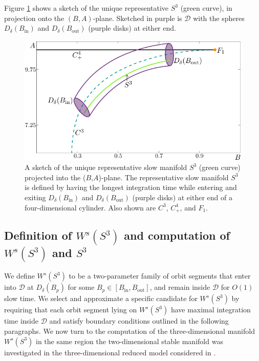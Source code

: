 \documentclass{ws-ijbc}
\begin{document}
Figure \ref{figure_2} shows a sketch of the unique representative $S^3$ (green curve), in projection onto the $(B,A)$-plane.  Sketched in purple is $\mathscr{D}$ with the spheres $D_\delta(B_{\mathrm{in}})$ and $D_\delta(B_{\mathrm{out}})$ (purple disks) at either end.

\begin{figure}[!t]
\begin{center}
\includegraphics{./figures/MKMO_2.pdf}
\end{center}
\caption{A sketch of the unique representative slow manifold $S^3$ (green curve) projected into the ($B$,$A$)-plane.  The representative slow manifold $S^3$ is defined by having the longest integration time while entering and exiting  $D_\delta(B_{\mathrm{in}})$ and $D_\delta(B_{\mathrm{out}})$ (purple disks) at either end of a four-dimensional cylinder.  Also shown are $C^3$, $C^4_+$, and $F_1$.}
\label{figure_2}
\end{figure}

\subsection{Definition of $W^{s}(S^3)$ and computation of $W^{s}(S^3)$ and  $S^3$}

We define $W^{s}(S^3)$ to be a two-parameter family of orbit segments that enter into $\mathscr{D}$ at $D_{\delta}(B_p)$ for some $B_p \in [B_{\text{in}}, B_{\text{out}}]$, and remain inside $\mathscr{D}$ for $O(1)$ slow time.  We select and approximate a specific candidate for $W^{s}(S^3)$ by requiring that each orbit segment lying on $W^{s}(S^3)$ have maximal integration time inside $\mathscr{D}$ and satisfy boundary conditions outlined in the following paragraphs.  We now turn to the computation of the three-dimensional manifold $W^{s}(S^3)$ in the same region the two-dimensional stable manifold was investigated in the three-dimensional reduced model considered in \cite{QSSA}.
     
\end{document}
